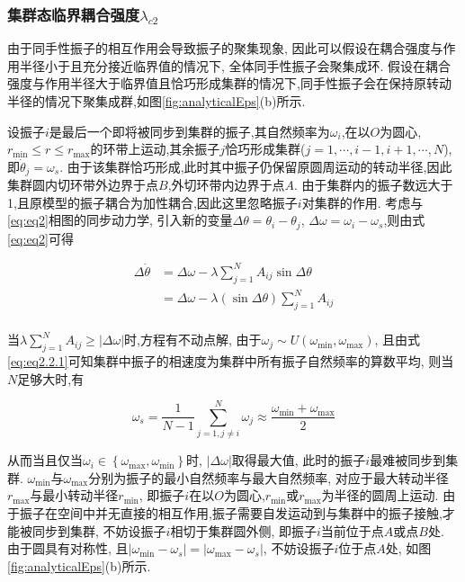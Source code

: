 \documentclass{article}
\begin{document}
\subsubsection{集群态临界耦合强度$\lambda_{c2}$}

由于同手性振子的相互作用会导致振子的聚集现象, 因此可以假设在耦合强度与作用半径小于且充分接近临界值的情况下, 全体同手性振子会聚集成环. 假设在耦合强度与作用半径大于临界值且恰巧形成集群的情况下,同手性振子会在保持原转动半径的情况下聚集成群,如图\ref{fig:analyticalEps}(b)所示.

设振子$i$是最后一个即将被同步到集群的振子,其自然频率为$\omega _i$,在以$O$为圆心,$r_{\min}\leqslant r\leqslant r_{\max}$的环带上运动,其余振子$j$恰巧形成集群($j=1,\cdots ,i-1,i+1,\cdots ,N$),即$\dot{\theta}_j=\omega_s$. 由于该集群恰巧形成,此时其中振子仍保留原圆周运动的转动半径,因此集群圆内切环带外边界于点$B$,外切环带内边界于点$A$. 由于集群内的振子数远大于1,且原模型的振子耦合为加性耦合,因此这里忽略振子$i$对集群的作用. 考虑与\ref{eq:eq2}相图的同步动力学, 引入新的变量$\Delta \theta =\theta _i-\theta _j$, $\Delta \omega =\omega _i-\omega _s$,则由式\ref{eq:eq2}可得

\begin{equation}\label{eq:eq3}
	\begin{aligned}
		\Delta \dot{\theta}&=\Delta \omega -\lambda \sum_{j=1}^N{A_{ij}\sin \Delta \theta}\\
		&=\Delta \omega -\lambda \left( \sin \Delta \theta \right) \sum_{j=1}^N{A_{ij}}\\
	\end{aligned}
\end{equation}

当$\lambda \sum_{j=1}^N{A_{ij}}\geqslant \left| \Delta \omega \right|$时,方程有不动点解, 由于$\omega _j\sim U\left( \omega _{\min}, \omega _{\max} \right) $, 且由式\ref{eq:eq2.2.1}可知集群中振子的相速度为集群中所有振子自然频率的算数平均, 则当$N$足够大时,有

$$
\omega _s=\frac{1}{N-1}\sum_{j=1,j\ne i}^N{\omega _j}\approx \frac{\omega _{\min}+\omega _{\max}}{2}
$$

从而当且仅当$\omega _i\in \left\{ \omega _{\max},\omega _{\min} \right\}$时, $\left| \Delta \omega \right|$取得最大值, 此时的振子$i$最难被同步到集群. 
$\omega _{\min}$与$\omega _{\max}$分别为振子的最小自然频率与最大自然频率, 对应于最大转动半径$r_{\max}$与最小转动半径$r_{\min}$, 即振子$i$在以$O$为圆心,$r_{\min}$或$r_{\max}$为半径的圆周上运动. 
由于振子在空间中并无直接的相互作用,振子需要自发运动到与集群中的振子接触,才能被同步到集群, 不妨设振子$i$相切于集群圆外侧, 即振子$i$当前位于点$A$或点$B$处.
由于圆具有对称性, 且$\left| \omega _{\min}-\omega _s \right|=\left| \omega _{\max}-\omega _s \right|$, 不妨设振子$i$位于点$A$处, 如图\ref{fig:analyticalEps}(b)所示.
\end{document}

